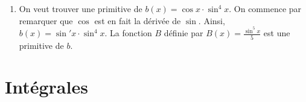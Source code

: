 \begin{thm}
\begin{ex}
\begin{enumerate}
                              Ainsi, la fonction $A$ d\'efinie par $A(x) = \sin (x^2)$ est une primitive de $a$.
                        \item On veut trouver une primitive de $b(x) = \cos x \cdot \sin^4 x$.
                              On commence par remarquer que $\cos$ est en fait la d\'eriv\'ee de $\sin$.
                              Ainsi, $b(x) = \sin' x \cdot \sin^4 x$.
                              La fonction $B$ d\'efinie par $B(x) = \frac{\sin^5 x}{5}$ est une primitive de $b$.
                  \end{enumerate}
            \end{ex}
      \end{thm}
      \section{Int\'egrales}
